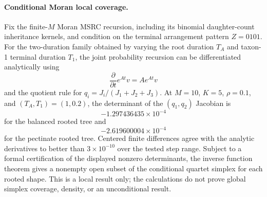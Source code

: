 \paragraph{Conditional Moran local coverage.}
Fix the finite-$M$ Moran MSRC recursion, including its binomial daughter-count
inheritance kernels, and condition on the terminal arrangement pattern
$Z=0101$. For the two-duration family obtained by varying the root duration
$T_A$ and taxon-1 terminal duration $T_1$, the joint probability recursion can
be differentiated analytically using
\[
\frac{\partial}{\partial t}e^{At}v=Ae^{At}v
\]
and the quotient rule for
$q_i=J_i/(J_1+J_2+J_3)$. At $M=10$, $K=5$, $\rho=0.1$, and
$(T_A,T_1)=(1,0.2)$, the determinant of the $(q_1,q_2)$ Jacobian is
\[
 -1.297436435\times10^{-4}
\]
for the balanced rooted tree and
\[
 -2.619600004\times10^{-4}
\]
for the pectinate rooted tree. Centered finite differences agree with the
analytic derivatives to better than $3\times10^{-10}$ over the tested step
range. Subject to a formal certification of the displayed nonzero
determinants, the inverse function theorem gives a nonempty open subset of the
conditional quartet simplex for each rooted shape. This is a local result only;
the calculations do not prove global simplex coverage, density, or an
unconditional result.
